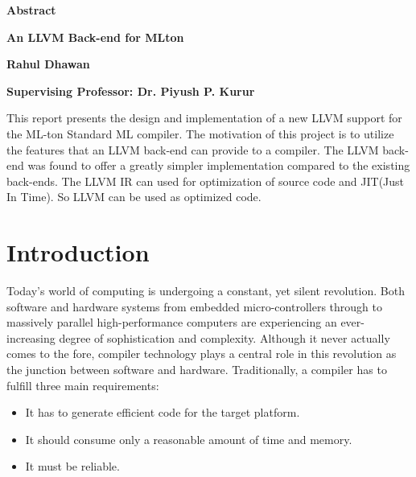 \documentclass{book}
\begin{document}
\thispagestyle{plain}
\begin{center}
    
    \huge{\textbf{Abstract}}
 
    \vspace{0.4cm}
    \large
    \textbf{An LLVM Back-end for MLton}
    
    \vspace{0.4cm}
    \textbf{Rahul Dhawan}
 
    \vspace{0.4cm}
    \textbf{Supervising Professor: Dr. Piyush P. Kurur }
    
    \vspace{1.0cm}
    \justify
    This report presents the design and implementation of a new LLVM support for the ML-ton Standard ML compiler. The motivation of this project is to utilize the features that an LLVM back-end can provide to a compiler.  The LLVM back-end was found to offer a greatly simpler implementation compared to the existing back-ends. The LLVM IR can used for optimization of source code and JIT(Just In Time). So LLVM can be used as optimized code. 
\end{center}

\tableofcontents

\chapter{Introduction}
   \Large
   Today's world of computing is undergoing a constant, yet silent revolution. Both
   software and hardware systems from embedded micro-controllers through to massively
   parallel high-performance computers are experiencing an ever-increasing degree of
   sophistication and complexity. Although it never actually comes to the fore, compiler
   technology plays a central role in this revolution as the junction between software and
   hardware. Traditionally, a compiler has to fulfill three main requirements:
   \begin{itemize}
   	\item It has to generate efficient code for the target platform.
   	\item It should consume only a reasonable amount of time and memory.
   	\item It must be reliable.
   \end{itemize}
\end{document}
